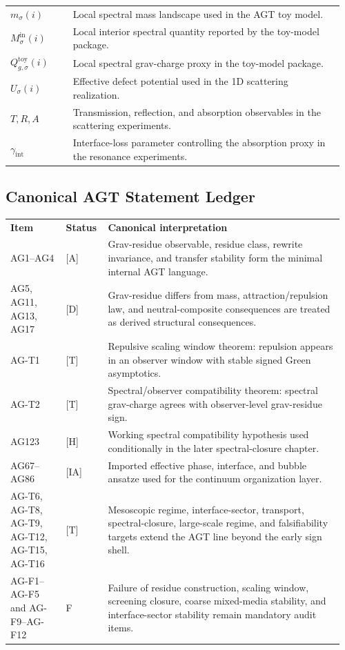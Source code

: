 \begin{longtable}{@{}L{0.18\linewidth}L{0.78\linewidth}@{}}
$m_\sigma(i)$ & Local spectral mass landscape used in the AGT toy model. \\
$M^{\mathrm{in}}_\sigma(i)$ & Local interior spectral quantity reported by the toy-model package. \\
$Q^{\mathrm{toy}}_{g,\sigma}(i)$ & Local spectral grav-charge proxy in the toy-model package. \\
$U_\sigma(i)$ & Effective defect potential used in the 1D scattering realization. \\
$T,R,A$ & Transmission, reflection, and absorption observables in the scattering experiments. \\
$\gamma_{\mathrm{int}}$ & Interface-loss parameter controlling the absorption proxy in the resonance experiments. \\
\end{longtable}

\subsection*{Canonical AGT Statement Ledger}

\begin{longtable}{@{}L{0.16\linewidth}L{0.12\linewidth}L{0.68\linewidth}@{}}
\textbf{Item} & \textbf{Status} & \textbf{Canonical interpretation} \\
AG1--AG4 & {[A]} & Grav-residue observable, residue class, rewrite invariance, and transfer stability form the minimal internal AGT language. \\
AG5, AG11, AG13, AG17 & {[D]} & Grav-residue differs from mass, attraction/repulsion law, and neutral-composite consequences are treated as derived structural consequences. \\
AG-T1 & {[T]} & Repulsive scaling window theorem: repulsion appears in an observer window with stable signed Green asymptotics. \\
AG-T2 & {[T]} & Spectral/observer compatibility theorem: spectral grav-charge agrees with observer-level grav-residue sign. \\
AG123 & {[H]} & Working spectral compatibility hypothesis used conditionally in the later spectral-closure chapter. \\
AG67--AG86 & {[IA]} & Imported effective phase, interface, and bubble ansatze used for the continuum organization layer. \\
AG-T6, AG-T8, AG-T9, AG-T12, AG-T15, AG-T16 & {[T]} & Mesoscopic regime, interface-sector, transport, spectral-closure, large-scale regime, and falsifiability targets extend the AGT line beyond the early sign shell. \\
AG-F1--AG-F5 and AG-F9--AG-F12 & F & Failure of residue construction, scaling window, screening closure, coarse mixed-media stability, and interface-sector stability remain mandatory audit items. \\
\end{longtable}

